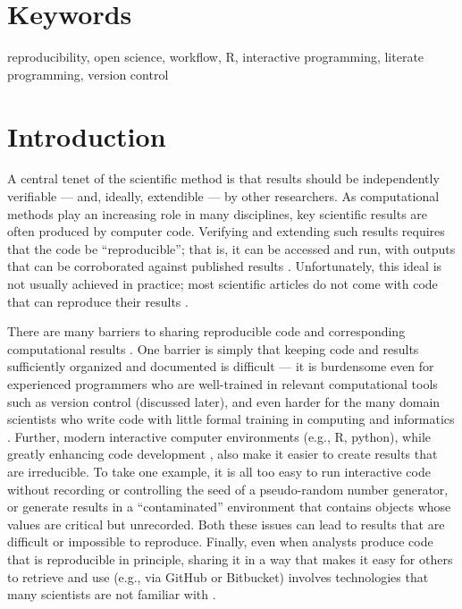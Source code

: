 \documentclass[9pt,a4paper]{extarticle}
\begin{document}
\section*{Keywords}

reproducibility, open science, workflow, R, interactive programming,
literate programming, version control

\clearpage

\pagestyle{main}


\section*{Introduction}

A central tenet of the scientific method is that results should be
independently verifiable --- and, ideally, extendible --- by other
researchers. As computational methods play an increasing role in many
disciplines, key scientific results are often produced by computer code.
Verifying and extending such results requires that the code be
``reproducible''; that is, it can be accessed and run, with outputs that
can be corroborated against published results \cite{Buckheit1995,
Gentleman2007, Peng2011, Ince2012, Morin2012, Sandve2013,
Easterbrook2014, Stodden2016, Lowndes2017}. Unfortunately, this ideal is
not usually achieved in practice; most scientific articles do not come
with code that can reproduce their results \cite{Ioannidis2009,
Merali2010, Ioannidis2014, Stodden2018}.

There are many barriers to sharing reproducible code and corresponding
computational results \cite{kitzes2017}. One barrier is simply that
keeping code and results sufficiently organized and documented is
difficult --- it is burdensome even for experienced programmers who are
well-trained in relevant computational tools such as version control
(discussed later), and even harder for the many domain scientists who
write code with little formal training in computing and informatics
\cite{Wilson2014}. Further, modern interactive computer environments
(e.g., R, python), while greatly enhancing code development
\cite{Findler2002}, also make it easier to create results that are
irreducible. To take one example, it is all too easy to run interactive
code without recording or controlling the seed of a pseudo-random number
generator, or generate results in a ``contaminated'' environment that
contains objects whose values are critical but unrecorded. Both these
issues can lead to results that are difficult or impossible to
reproduce. Finally, even when analysts produce code that is reproducible
in principle, sharing it in a way that makes it easy for others to
retrieve and use (e.g., via GitHub or Bitbucket) involves technologies
that many scientists are not familiar with \cite{Marwick2017,
Stodden2018}.
\end{document}

